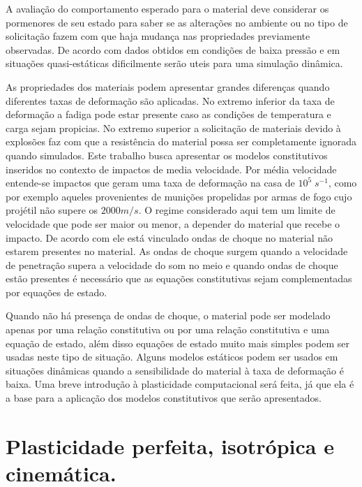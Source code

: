  A avaliação do comportamento esperado para o material deve considerar os pormenores de seu estado para saber se as alterações no ambiente ou no tipo de solicitação fazem com que haja mudança nas propriedades previamente observadas. De acordo com \cite{Zukas} dados obtidos em condições de baixa pressão e em situações quasi-estáticas dificilmente serão uteis para uma simulação dinâmica. \par

As propriedades dos materiais podem apresentar grandes diferenças quando diferentes taxas de deformação são aplicadas. No extremo inferior da taxa de deformação a fadiga pode estar presente caso as condições de temperatura e carga sejam propicias. No extremo superior a solicitação de materiais devido à explosões faz com que a resistência do material possa ser completamente ignorada quando simulados. Este trabalho busca apresentar os modelos constitutivos inseridos no contexto de impactos de media velocidade. Por média velocidade entende-se impactos que geram uma taxa de deformação na casa de $ 10^5 \; s^{-1} $, como por exemplo aqueles provenientes de munições propelidas por armas de fogo cujo projétil não supere os $2000 m/s$. O regime considerado aqui tem um limite de velocidade que pode ser maior ou menor, a depender do material que recebe o impacto. De acordo com \cite{Hazell} ele está vinculado ondas de choque no material não estarem presentes no material. As ondas de choque surgem quando a velocidade de penetração supera a velocidade do som no meio e quando ondas de choque estão presentes é necessário que as equações constitutivas sejam complementadas por equações de estado. \par

Quando não há presença de ondas de choque, o material pode ser modelado apenas por uma relação constitutiva ou por uma relação constitutiva e uma equação de estado, além disso equações de estado muito mais simples podem ser usadas neste tipo de situação. Alguns modelos estáticos podem ser usados em situações dinâmicas quando a sensibilidade do material à taxa de deformação é baixa. Uma breve introdução à plasticidade computacional será feita, já que ela é a base para a aplicação dos modelos constitutivos que serão apresentados. \\

\section{Plasticidade perfeita, isotrópica e cinemática.}

